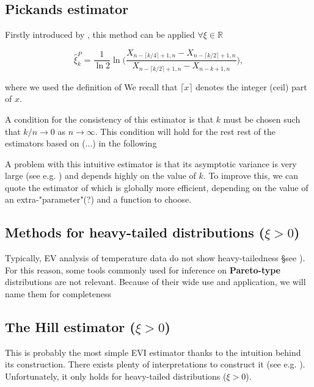\documentclass[11pt,a4paper,openany ]{book}
\begin{document}
\subsection*{Pickands estimator}


Firstly introduced by \cite{pickands_statistical_1975}, this method can be applied $\forall\xi\in\mathbb{R}$

\begin{equation}
\hat{\xi}^P_{k}= \frac{1}{\ln 2}\ln \Bigg(\frac{X_{n-\lceil k/4\rceil +1,n}-X_{n-\lceil k/2\rceil+1,n}}{X_{n-\lceil k/2\rceil +1,n}-X_{n-k+1,n}}\Bigg),
\end{equation}

where we used the definition of \citet{beirlant_statistics_2006}
We recall that $\lceil x\rceil$ denotes the integer (ceil) part of $x$.

A condition for the consistency of this estimator is that $k$ must be chosen such that $k/n\rightarrow 0$ as $n\rightarrow \infty$. This condition will hold for the rest rest of the estimators based on (...) in the following 

A problem with this intuitive estimator is that its asymptotic variance is very large (see e.g. \cite{dekkers_estimation_1989}) and depends highly on the value of $k$. To improve this, we can quote the estimator of \cite{segers_generalized_2001} which is globally more efficient, depending on the value of an extra-"parameter"(?) and a function to choose.


\subsection*{Methods for heavy-tailed distributions ($\xi>0$)}

Typically, EV analysis of temperature data do not show heavy-tailedness §see \citet{}). For this reason, some tools commonly used for inference on \textbf{Pareto-type} distributions are not relevant. Because of their wide use and application, we will name them for completeness


\subsection*{The Hill estimator ($\xi>0$)}


This is probably the most simple EVI estimator thanks to the intuition behind its construction. There exists plenty of interpretations to construct it (see e.g. \citet[pp.101-104]{beirlant_statistics_2006}). Unfortunately, it only holds for heavy-tailed distributions ($\xi>0$). 
\end{document}
